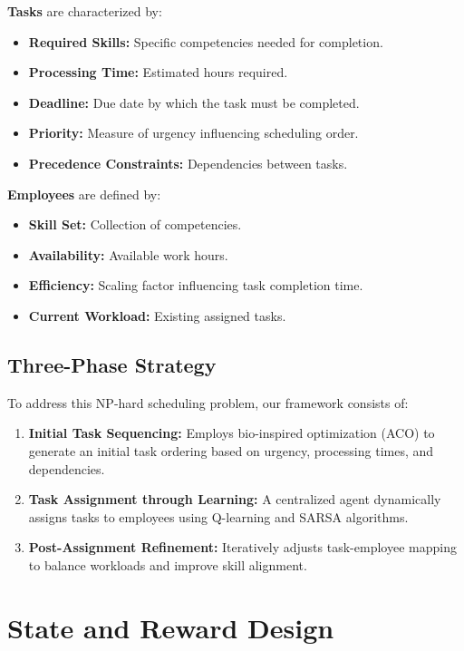 \documentclass[12pt]{article}
\begin{document}
	\textbf{Tasks} are characterized by:
	\begin{itemize}
		\item \textbf{Required Skills:} Specific competencies needed for completion.
		\item \textbf{Processing Time:} Estimated hours required.
		\item \textbf{Deadline:} Due date by which the task must be completed.
		\item \textbf{Priority:} Measure of urgency influencing scheduling order.
		\item \textbf{Precedence Constraints:} Dependencies between tasks.
	\end{itemize}
	
	\textbf{Employees} are defined by:
	\begin{itemize}
		\item \textbf{Skill Set:} Collection of competencies.
		\item \textbf{Availability:} Available work hours.
		\item \textbf{Efficiency:} Scaling factor influencing task completion time.
		\item \textbf{Current Workload:} Existing assigned tasks.
	\end{itemize}
	
	\subsection{\label{subsec:strategy}Three-Phase Strategy}
	
	To address this NP-hard scheduling problem, our framework consists of:
	
	\begin{enumerate}
		\item \textbf{Initial Task Sequencing:} Employs bio-inspired optimization (ACO) to generate an initial task ordering based on urgency, processing times, and dependencies.
		
		\item \textbf{Task Assignment through Learning:} A centralized agent dynamically assigns tasks to employees using Q-learning and SARSA algorithms.
		
		\item \textbf{Post-Assignment Refinement:} Iteratively adjusts task-employee mapping to balance workloads and improve skill alignment.
	\end{enumerate}
	
	\section{\label{sec:state}State and Reward Design}
	
\end{document}
